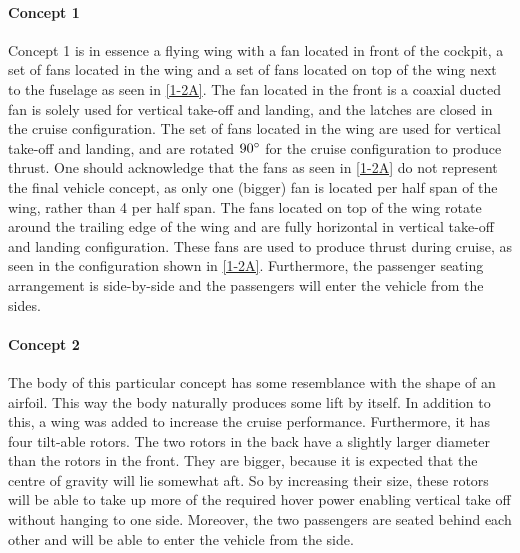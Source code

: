 \paragraph{Concept 1}
Concept 1 is in essence a flying wing with a fan located in front of the cockpit, a set of fans located in the wing and a set of fans located on top of the wing next to the fuselage as seen in \autoref{1-2A}. The fan located in the front is a coaxial ducted fan is solely used for vertical take-off and landing, and the latches are closed in the cruise configuration. The set of fans located in the wing are used for vertical take-off and landing, and are rotated $90\degree$ for the cruise configuration to produce thrust. One should acknowledge that the fans as seen in \autoref{1-2A} do not represent the final vehicle concept, as only one (bigger) fan is located per half span of the wing, rather than 4 per half span. The fans located on top of the wing rotate around the trailing edge of the wing and are fully horizontal in vertical take-off and landing configuration. These fans are used to produce thrust during cruise, as seen in the configuration shown in \autoref{1-2A}. Furthermore, the passenger seating arrangement is side-by-side and the passengers will enter the vehicle from the sides.

\paragraph{Concept 2}
The body of this particular concept has some resemblance with the shape of an airfoil. This way the body naturally produces some lift by itself. In addition to this, a wing was added to increase the cruise performance. Furthermore, it has four tilt-able rotors. The two rotors in the back have a slightly larger diameter than the rotors in the front. They are bigger, because it is expected that the centre of gravity will lie somewhat aft. So by increasing their size, these rotors will be able to take up more of the required hover power enabling vertical take off without hanging to one side. Moreover, the two passengers are seated behind each other and will be able to enter the vehicle from the side. 

